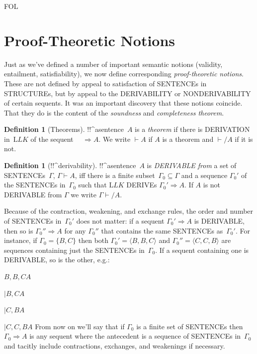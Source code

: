 \documentclass[10pt,a4paper]{article}
\newcommand*{\olup}[1]{\MakeUppercase{#1}}
\theoremstyle{plain}
\theoremstyle{definition}
\newtheorem{defn}[thm]{Definition}
\theoremstyle{remark}
\newenvironment{explain}{}{}
\newcommand*{\olfileid}[3]{}
\newcommand*{\olsection}[1]{\section*{#1}}
\providecommand{\AxiomC}[1]{}
\providecommand{\RightLabel}[1]{}
\providecommand{\fCenter}{}
\newenvironment{prooftree}{}{}
\providecommand{\Sequent}{\mathrel{\Rightarrow}}
\providecommand{\Proves}{\mathrel{\vdash}}
\providecommand{\Log}{\ensuremath{\mathrm{L}}}
\providecommand{\tuple}[1]{\langle #1 \rangle}
\providecommand{\iftag}[1]{#1}
\providecommand{\LeftR}[1]{}
\providecommand{\Deduce}{\mathrm{D}}
\providecommand{\UnaryInf}{\ensuremath{\mid}}
\providecommand{\Weakening}{\mathrm{Wk}}
\providecommand{\LeftR}{\mathrm{L}}
\providecommand{\Contraction}{\mathrm{C}}
\providecommand{\iftag}{}
\begin{document}
\iftag{FOL}
      {\olfileid{fol}{seq}{ptn}}
      {\olfileid{pl}{seq}{ptn}}

\olsection{Proof-Theoretic Notions}

\begin{explain}
Just as we've defined a number of important semantic notions
(validity, entailment, satisfiability), we now define corresponding
\emph{proof-theoretic notions}.  These are not defined by appeal to
satisfaction of \olup{sentence}s in \olup{structure}s, but by appeal to the
\olup{derivability} or \olup{nonderivability} of certain sequents.  It was
an important discovery that these notions coincide.  That they do is
the content of the \emph{soundness} and \emph{completeness theorem}.
\end{explain}

\begin{defn}[Theorems]
!!^a{sentence}~$A$ is a \emph{theorem} if there is \olup{derivation}
in~$\Log{LK}$ of the sequent $\quad \Sequent A$.  We write $\Proves
A$ if $A$ is a theorem and $\Proves/ A$ if it is not.
\end{defn}

\begin{defn}[!!^{derivability}]
!!^a{sentence}~$A$ is \emph{\olup{derivable} from} a set of
\olup{sentence}s~$\Gamma$, $\Gamma \Proves A$, iff there is a
finite subset~$\Gamma_0 \subseteq \Gamma$ and a sequence $\Gamma_0'$
of the \olup{sentence}s in~$\Gamma_0$ such that $\Log{LK}$ \olup{derive}s
$\Gamma_0' \Sequent A$.  If $A$ is not \olup{derivable} from $\Gamma$
we write $\Gamma \Proves/ A$.
\end{defn}

Because of the contraction, weakening, and exchange rules, the order
and number of \olup{sentence}s in~$\Gamma_0'$ does not matter: if a
sequent $\Gamma_0' \Sequent A$ is \olup{derivable}, then so is
$\Gamma_0'' \Sequent A$ for any $\Gamma_0''$ that contains the same
\olup{sentence}s as~$\Gamma_0'$.  For instance, if $\Gamma_0 = \{B, C\}$
then both $\Gamma_0' = \tuple{B, B, C}$ and $\Gamma_0'' =
\tuple{C, C, B}$ are sequences containing just the \olup{sentence}s
in~$\Gamma_0$. If a sequent containing one is \olup{derivable}, so is the
other, e.g.:
\begin{prooftree}
  \AxiomC{}
  \Deduce$B, B, C \fCenter A$
  \RightLabel{\LeftR{\Contraction}}
  \UnaryInf$B, C \fCenter A$
  \RightLabel{\LeftR{\Exchange}}
  \UnaryInf$C, B \fCenter A$
  \RightLabel{\LeftR{\Weakening}}
  \UnaryInf$C, C, B \fCenter A$
\end{prooftree}
From now on we'll say that if $\Gamma_0$ is a finite set of
\olup{sentence}s then $\Gamma_0 \Sequent A$ is any sequent where the
antecedent is a sequence of \olup{sentence}s in~$\Gamma_0$ and tacitly include
contractions, exchanges, and weakenings if necessary.
\end{document}
